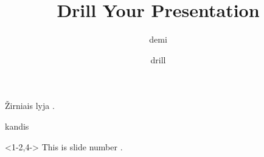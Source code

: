 \documentclass{beamer}
\title[drill]{Drill Your Presentation}
\author{demi}
\institute{}
\date{drill}
\begin{document}
\begin{frame}
  \titlepage
\end{frame}

\fm Žirniais lyja .

\begin{frame}[c]
  \begin{center}\LARGE
    kandis
%    
  \end{center}


\end{frame}

\begin{frame}<1-2,4->
  This is slide number
  .
\end{frame}
\end{document}
